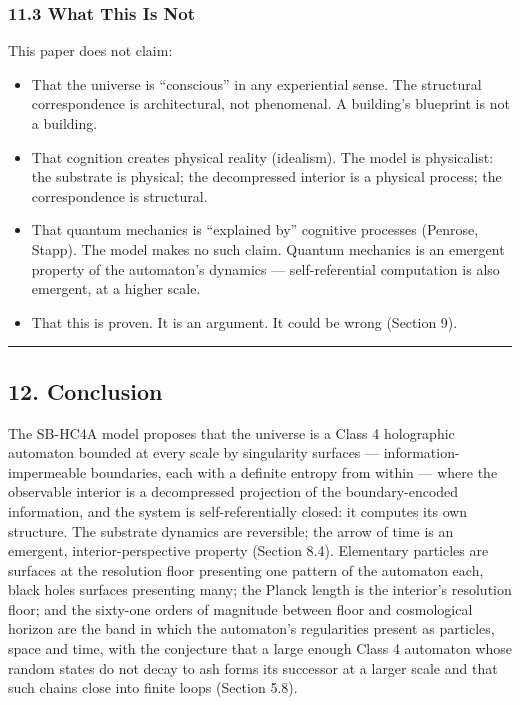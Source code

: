 \documentclass[
]{article}
\providecommand{\tightlist}{%
  \setlength{\itemsep}{0pt}\setlength{\parskip}{0pt}}
\begin{document}
\hypertarget{what-this-is-not}{%
\subsubsection{11.3 What This Is Not}\label{what-this-is-not}}

This paper does not claim:

\begin{itemize}
\tightlist
\item
  That the universe is ``conscious'' in any experiential sense. The
  structural correspondence is architectural, not phenomenal. A
  building's blueprint is not a building.
\item
  That cognition creates physical reality (idealism). The model is
  physicalist: the substrate is physical; the decompressed interior is a
  physical process; the correspondence is structural.
\item
  That quantum mechanics is ``explained by'' cognitive processes
  (Penrose, Stapp). The model makes no such claim. Quantum mechanics is
  an emergent property of the automaton's dynamics --- self-referential
  computation is also emergent, at a higher scale.
\item
  That this is proven. It is an argument. It could be wrong (Section 9).
\end{itemize}

\begin{center}\rule{0.5\linewidth}{0.5pt}\end{center}

\hypertarget{conclusion}{%
\subsection{12. Conclusion}\label{conclusion}}

The SB-HC4A model proposes that the universe is a Class 4 holographic
automaton bounded at every scale by singularity surfaces ---
information-impermeable boundaries, each with a definite entropy from
within --- where the observable interior is a decompressed projection of
the boundary-encoded information, and the system is self-referentially
closed: it computes its own structure. The substrate dynamics are
reversible; the arrow of time is an emergent, interior-perspective
property (Section 8.4). Elementary particles are surfaces at the
resolution floor presenting one pattern of the automaton each, black
holes surfaces presenting many; the Planck length is the interior's
resolution floor; and the sixty-one orders of magnitude between floor
and cosmological horizon are the band in which the automaton's
regularities present as particles, space and time, with the conjecture
that a large enough Class 4 automaton whose random states do not decay
to ash forms its successor at a larger scale and that such chains close
into finite loops (Section 5.8).
\end{document}
